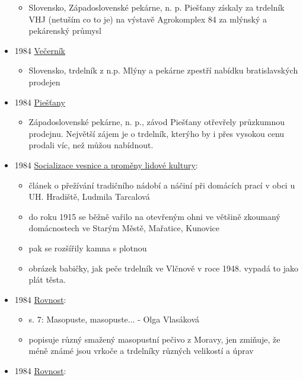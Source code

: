 \begin{itemize}
  \begin{itemize}
  \tightlist
  \item
    Slovensko, Západoslovenské pekárne, n. p. Piešťany získaly za
    trdelník VHJ (netuším co to je) na výstavě Agrokomplex 84 za mlýnský
    a pekárenský průmysl
  \end{itemize}
\item
  1984
  \href{https://dikda.snk.sk/uuid/uuid:a8b9dc68-bf2f-4a1c-93e9-81f3cff1ab98}{Večerník}

  \begin{itemize}
  \tightlist
  \item
    Slovensko, trdelník z n.p. Mlýny a pekárne zpestří nabídku
    bratislavských prodejen
  \end{itemize}
\item
  1984
  \href{https://dikda.snk.sk/uuid/uuid:de963c61-5ac8-4073-8c7c-12d5370aa4f0}{Piešťany}

  \begin{itemize}
  \tightlist
  \item
    Západoslovenské pekárne, n. p., závod Piešťany otřevřely průzkumnou
    prodejnu. Největší zájem je o trdelník, kterýho by i přes vysokou
    cenu prodali víc, než můžou nabídnout.
  \end{itemize}
\item
  1984
  \href{https://ceskadigitalniknihovna.cz/uuid/uuid:065a3d70-f844-11e5-92c7-5ef3fc9ae867}{Socializace
  vesnice a proměny lidové kultury}:

  \begin{itemize}
  \tightlist
  \item
    článek o přežívání tradičního nádobí a náčiní při domácích prací v
    obci u UH. Hradiště, Ludmila Tarcalová
  \item
    do roku 1915 se běžně vařilo na otevřeným ohni ve většině zkoumaný
    domácnostech ve Starým Městě, Mařatice, Kunovice
  \item
    pak se rozšířily kamna s plotnou
  \item
    obrázek babičky, jak peče trdelník ve Vlčnově v roce 1948. vypadá to
    jako plát těsta.
  \end{itemize}
\item
  1984
  \href{https://ndk.cz/uuid/uuid:831adb20-0cb3-11f0-9e41-5ef3fc9bb22f}{Rovnost}:

  \begin{itemize}
  \tightlist
  \item
    s. 7: Masopuste, masopuste... - Olga Vlasáková
  \item
    popisuje různý smažený masopustní pečivo z Moravy, jen zmiňuje, že
    méně známé jsou vrkoče a trdelníky různých velikostí a úprav
  \end{itemize}
\item
  1984
  \href{https://ceskadigitalniknihovna.cz/uuid/uuid:0571ff20-0cbb-11f0-9e41-5ef3fc9bb22f}{Rovnost}:


\end{itemize}
